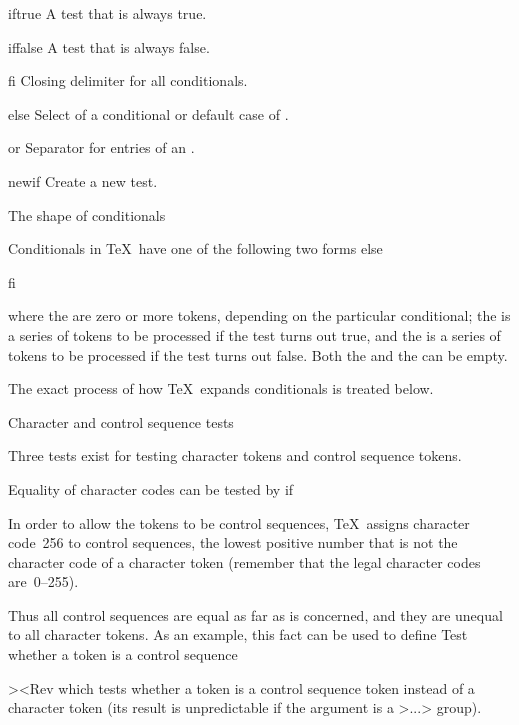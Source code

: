 \item iftrue 
      A test that is always true.
\item iffalse 
      A test that is always false.
\item fi 
      Closing delimiter for all conditionals.

\item else 
      Select  of a conditional 
      or default case of .

\item or 
      Separator for entries of an .

\item newif 
     Create a new test.

\inventstop

\point The shape of conditionals

Conditionals in \TeX\ have one of the following two forms
\csterm else\par\csterm fi\par
\disp{}\nl
     \dispstop
where the  are zero or more tokens, depending on
the particular conditional; the  is a series of tokens
to be processed if the test turns out true, and the 
is a series of tokens to be processed if the test turns out false.
Both the  and the  can be empty.

The exact process of how \TeX\ expands conditionals is treated
below.

\point Character and control sequence tests

Three tests exist for testing character tokens and
control sequence tokens.

\spoint {}

Equality of character codes can be tested by
\csterm if\par
\Disp{}\Dispstop
In order to allow the tokens to be control sequences,
\TeX\ assigns character code~256 to control sequences,
the lowest positive number that is not the character code of a
character token (remember that the legal character codes
are~0--255).

Thus all control sequences are equal as far as  is
concerned, and they are unequal to all character tokens.
As an example, this fact can be used to define
\howto Test whether a token is a control sequence\par
\Ver>\def\ifIsControlSequence#1{\if\noexpand#1\relax}<Rev
which tests whether a token is a control sequence token
instead of a character token (its result is unpredictable
if the argument is a \ver>{...}> group).

